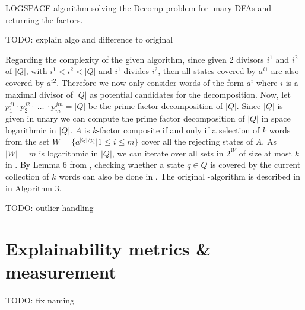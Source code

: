 \begin{algorithm}[H]
	\label{algo:composite}
	\DontPrintSemicolon

	
	
	\caption{LOGSPACE-algorithm solving the Decomp problem for unary DFAs and returning the factors.}
\end{algorithm}

TODO: explain algo and difference to original

Regarding the complexity of the given algorithm, since given 2 divisors $i^1$ and $i^2$ of $|Q|$, with $i^1 < i^2 <|Q|$ and $i^1$ divides $i^2$, then all states covered by $a^{i1}$ are also covered by $a^{i2}$. Therefore we now only consider words of the form $a^i$ where $i$ is a maximal divisor of $|Q|$ as potential candidates for the decomposition. Now, let $p_1^{j1} \cdot p_2^{j2} \cdot ~ \dots ~\cdot p_m^{jm} = |Q|$ be the prime factor decomposition of $|Q|$. Since $|Q|$ is given in unary we can compute the prime factor decomposition of $|Q|$ in space logarithmic in $|Q|$. $A$ is $k$-factor composite if and only if a selection of $k$ words from the set $W = \{a^{|Q|/p_i} | 1 \leq i \leq m\}$ cover all the rejecting states of $A$.  As $|W| = m$ is logarithmic in $|Q|$, we can iterate over all sets in $2^W$ of size at most $k$ in \LogSpace. By Lemma 6 from \cite{DBLP:journals/corr/abs-2107-04683}, checking whether a state $q \in Q$ is covered by the current collection of $k$ words can also be done in \LogSpace. The original \LogSpace-algorithm is described in \cite{DBLP:journals/corr/abs-2107-04683} in Algorithm 3.

TODO: outlier handling

\section{Explainability metrics \& measurement}
TODO: fix naming


